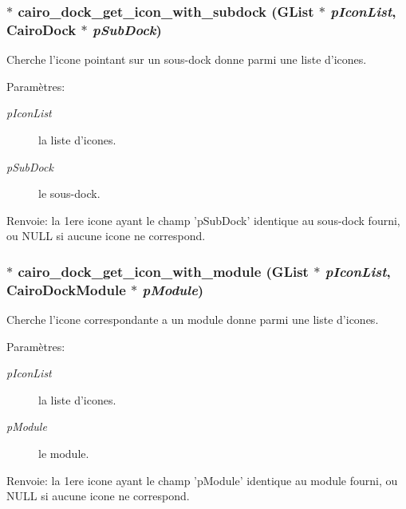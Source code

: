 \subsubsection{$\ast$ cairo\_\-dock\_\-get\_\-icon\_\-with\_\-subdock (GList $\ast$ {\em pIconList}, {\bf CairoDock} $\ast$ {\em pSubDock})}\label{cairo-dock-icons_8h_87b911e3bc92d45896c945589290d586}


Cherche l'icone pointant sur un sous-dock donne parmi une liste d'icones. \begin{Desc}
\item[Paramètres:]
\begin{description}
\item[{\em pIconList}]la liste d'icones. \item[{\em pSubDock}]le sous-dock. \end{description}
\end{Desc}
\begin{Desc}
\item[Renvoie:]la 1ere icone ayant le champ 'pSubDock' identique au sous-dock fourni, ou NULL si aucune icone ne correspond. \end{Desc}
\subsubsection{$\ast$ cairo\_\-dock\_\-get\_\-icon\_\-with\_\-module (GList $\ast$ {\em pIconList}, {\bf CairoDockModule} $\ast$ {\em pModule})}\label{cairo-dock-icons_8h_4d6bf4d25995b5e7afb89b5b47180494}


Cherche l'icone correspondante a un module donne parmi une liste d'icones. \begin{Desc}
\item[Paramètres:]
\begin{description}
\item[{\em pIconList}]la liste d'icones. \item[{\em pModule}]le module. \end{description}
\end{Desc}
\begin{Desc}
\item[Renvoie:]la 1ere icone ayant le champ 'pModule' identique au module fourni, ou NULL si aucune icone ne correspond. \end{Desc}
